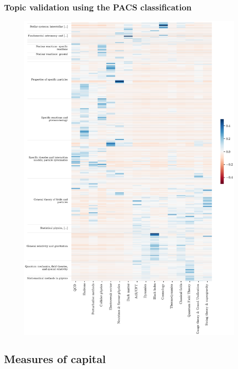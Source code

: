 \documentclass{article}
\begin{document}
\subsubsection{\label{appendix:pacs_validation}Topic validation using the PACS classification}


\begin{figure}[H]
    \centering
    \includegraphics[height=0.75\paperheight
]{plots/pacs_clustermap.eps}
    \caption{}
\end{figure}


\subsection{\label{appendix:capital_validation}Measures of capital}
\end{document}
